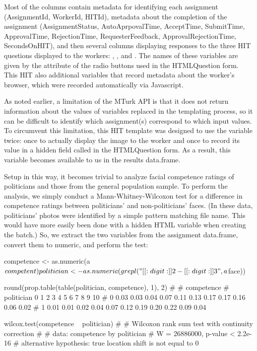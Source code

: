 \noindent Most of the columns contain metadata for identifying each assignment (AssignmentId, WorkerId, HITId), metadata about the completion of the assignment (AssignmentStatus, AutoAprpovalTime, AcceptTime, SubmitTime, ApprovalTime, RejectionTime, RequesterFeedback, ApprovalRejectionTime, SecondsOnHIT), and then several columns displaying responses to the three HIT questions displayed to the workers: , , and . The names of these variables are given by the  attribute of the radio buttons used in the HTMLQuestion form. This HIT also additional variables that record metadata about the worker's browser, which were recorded automatically via Javascript.

As noted earlier, a limitation of the MTurk API is that it does not return information about the values of variables replaced in the templating process, so it can be difficult to identify which assignment(s) correspond to which input values. To circumvent this limitation, this HIT template was designed to use the  variable twice: once to actually display the image to the worker and once to record its value in a hidden field called  in the HTMLQuestion form. As a result, this variable becomes available to us in the results data.frame.

Setup in this way, it becomes trivial to analyze facial competence ratings of politicians and those from the general population sample. To perform the analysis, we simply conduct a Mann-Whitney-Wilcoxon test for a difference in competence ratings between politicians' and non-politicians' faces. (In these data, politicians' photos were identified by a simple pattern matching file name. This would have more easily been done with a hidden HTML variable when creating the batch.) So, we extract the two variables from the assignment data.frame, convert them to numeric, and perform the test:

\begin{example}
competence <- as.numeric(a$competent)
politician <- as.numeric(grepl("[[:digit:]]{2}-[[:digit:]]{3}", a$face))

round(prop.table(table(politician, competence), 1), 2)
#
#           competence
# politician    0    1    2    3    4    5    6    7    8    9   10
#          0 0.03 0.03 0.04 0.07 0.11 0.13 0.17 0.17 0.16 0.06 0.02
#          1 0.01 0.01 0.02 0.04 0.07 0.12 0.19 0.20 0.22 0.09 0.04

wilcox.test(competence ~ politician)
# 
#         Wilcoxon rank sum test with continuity correction
# 
# data:  competence by politician
# W = 26886000, p-value < 2.2e-16
# alternative hypothesis: true location shift is not equal to 0
\end{example}

